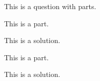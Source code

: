 \begin{question}
	This is a question with parts.
\end{question}

\begin{parts}

	\begin{part}
		This is a part.
	\end{part}

	\begin{solution}
		This is a solution.
	\end{solution}

	\begin{part}
		This is a part.
	\end{part}

	\begin{solution}
		This is a solution.
	\end{solution}

\end{parts}
